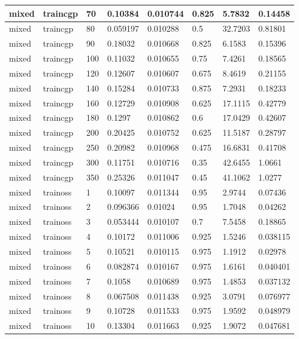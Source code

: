 \begin{longtable}{llllllll}
mixed & traincgp & 70 & 0.10384 & 0.010744 & 0.825 & 5.7832 & 0.14458 \\ \hline 
mixed & traincgp & 80 & 0.059197 & 0.010288 & 0.5 & 32.7203 & 0.81801 \\ \hline 
mixed & traincgp & 90 & 0.18032 & 0.010668 & 0.825 & 6.1583 & 0.15396 \\ \hline 
mixed & traincgp & 100 & 0.11032 & 0.010655 & 0.75 & 7.4261 & 0.18565 \\ \hline 
mixed & traincgp & 120 & 0.12607 & 0.010607 & 0.675 & 8.4619 & 0.21155 \\ \hline 
mixed & traincgp & 140 & 0.15284 & 0.010733 & 0.875 & 7.2931 & 0.18233 \\ \hline 
mixed & traincgp & 160 & 0.12729 & 0.010908 & 0.625 & 17.1115 & 0.42779 \\ \hline 
mixed & traincgp & 180 & 0.1297 & 0.010862 & 0.6 & 17.0429 & 0.42607 \\ \hline 
mixed & traincgp & 200 & 0.20425 & 0.010752 & 0.625 & 11.5187 & 0.28797 \\ \hline 
mixed & traincgp & 250 & 0.20982 & 0.010968 & 0.475 & 16.6831 & 0.41708 \\ \hline 
mixed & traincgp & 300 & 0.11751 & 0.010716 & 0.35 & 42.6455 & 1.0661 \\ \hline 
mixed & traincgp & 350 & 0.25326 & 0.011047 & 0.45 & 41.1062 & 1.0277 \\ \hline 
mixed & trainoss & 1 & 0.10097 & 0.011344 & 0.95 & 2.9744 & 0.07436 \\ \hline 
mixed & trainoss & 2 & 0.096366 & 0.01024 & 0.95 & 1.7048 & 0.04262 \\ \hline 
mixed & trainoss & 3 & 0.053444 & 0.010107 & 0.7 & 7.5458 & 0.18865 \\ \hline 
mixed & trainoss & 4 & 0.10172 & 0.011006 & 0.925 & 1.5246 & 0.038115 \\ \hline 
mixed & trainoss & 5 & 0.10521 & 0.010115 & 0.975 & 1.1912 & 0.02978 \\ \hline 
mixed & trainoss & 6 & 0.082874 & 0.010167 & 0.975 & 1.6161 & 0.040401 \\ \hline 
mixed & trainoss & 7 & 0.1058 & 0.010689 & 0.975 & 1.4853 & 0.037132 \\ \hline 
mixed & trainoss & 8 & 0.067508 & 0.011438 & 0.925 & 3.0791 & 0.076977 \\ \hline 
mixed & trainoss & 9 & 0.10728 & 0.011533 & 0.975 & 1.9592 & 0.048979 \\ \hline 
mixed & trainoss & 10 & 0.13304 & 0.011663 & 0.925 & 1.9072 & 0.047681 \\ \hline 

\end{longtable}
